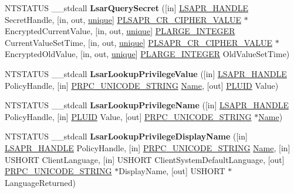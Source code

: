 \begin{DoxyCompactItemize}
\item 
\mbox{\label{interfacelsarpc_a48c9f6d409463cc2d64b30e95d5fe64d}} 
N\+T\+S\+T\+A\+T\+US \+\_\+\+\_\+stdcall {\bfseries Lsar\+Query\+Secret} (\mbox{[}in\mbox{]} \hyperlink{interfacevoid}{L\+S\+A\+P\+R\+\_\+\+H\+A\+N\+D\+LE} Secret\+Handle, \mbox{[}in, out, \hyperlink{interfaceunique}{unique}\mbox{]} \hyperlink{struct___l_s_a_p_r___c_r___c_i_p_h_e_r___v_a_l_u_e}{P\+L\+S\+A\+P\+R\+\_\+\+C\+R\+\_\+\+C\+I\+P\+H\+E\+R\+\_\+\+V\+A\+L\+UE} $\ast$Encrypted\+Current\+Value, \mbox{[}in, out, \hyperlink{interfaceunique}{unique}\mbox{]} \hyperlink{union___l_a_r_g_e___i_n_t_e_g_e_r}{P\+L\+A\+R\+G\+E\+\_\+\+I\+N\+T\+E\+G\+ER} Current\+Value\+Set\+Time, \mbox{[}in, out, \hyperlink{interfaceunique}{unique}\mbox{]} \hyperlink{struct___l_s_a_p_r___c_r___c_i_p_h_e_r___v_a_l_u_e}{P\+L\+S\+A\+P\+R\+\_\+\+C\+R\+\_\+\+C\+I\+P\+H\+E\+R\+\_\+\+V\+A\+L\+UE} $\ast$Encrypted\+Old\+Value, \mbox{[}in, out, \hyperlink{interfaceunique}{unique}\mbox{]} \hyperlink{union___l_a_r_g_e___i_n_t_e_g_e_r}{P\+L\+A\+R\+G\+E\+\_\+\+I\+N\+T\+E\+G\+ER} Old\+Value\+Set\+Time)
\item 
\mbox{\label{interfacelsarpc_a311d0deae1aded8af784931780df9447}} 
N\+T\+S\+T\+A\+T\+US \+\_\+\+\_\+stdcall {\bfseries Lsar\+Lookup\+Privilege\+Value} (\mbox{[}in\mbox{]} \hyperlink{interfacevoid}{L\+S\+A\+P\+R\+\_\+\+H\+A\+N\+D\+LE} Policy\+Handle, \mbox{[}in\mbox{]} \hyperlink{struct___r_p_c___u_n_i_c_o_d_e___s_t_r_i_n_g}{P\+R\+P\+C\+\_\+\+U\+N\+I\+C\+O\+D\+E\+\_\+\+S\+T\+R\+I\+NG} \hyperlink{struct_name_rec__}{Name}, \mbox{[}out\mbox{]} \hyperlink{struct___l_u_i_d}{P\+L\+U\+ID} Value)
\item 
\mbox{\label{interfacelsarpc_a47b15c19adf74a11362fe39097ce9430}} 
N\+T\+S\+T\+A\+T\+US \+\_\+\+\_\+stdcall {\bfseries Lsar\+Lookup\+Privilege\+Name} (\mbox{[}in\mbox{]} \hyperlink{interfacevoid}{L\+S\+A\+P\+R\+\_\+\+H\+A\+N\+D\+LE} Policy\+Handle, \mbox{[}in\mbox{]} \hyperlink{struct___l_u_i_d}{P\+L\+U\+ID} Value, \mbox{[}out\mbox{]} \hyperlink{struct___r_p_c___u_n_i_c_o_d_e___s_t_r_i_n_g}{P\+R\+P\+C\+\_\+\+U\+N\+I\+C\+O\+D\+E\+\_\+\+S\+T\+R\+I\+NG} $\ast$\hyperlink{struct_name_rec__}{Name})
\item 
\mbox{\label{interfacelsarpc_a10f7d77793f8385cd11f8502305c1982}} 
N\+T\+S\+T\+A\+T\+US \+\_\+\+\_\+stdcall {\bfseries Lsar\+Lookup\+Privilege\+Display\+Name} (\mbox{[}in\mbox{]} \hyperlink{interfacevoid}{L\+S\+A\+P\+R\+\_\+\+H\+A\+N\+D\+LE} Policy\+Handle, \mbox{[}in\mbox{]} \hyperlink{struct___r_p_c___u_n_i_c_o_d_e___s_t_r_i_n_g}{P\+R\+P\+C\+\_\+\+U\+N\+I\+C\+O\+D\+E\+\_\+\+S\+T\+R\+I\+NG} \hyperlink{struct_name_rec__}{Name}, \mbox{[}in\mbox{]} U\+S\+H\+O\+RT Client\+Language, \mbox{[}in\mbox{]} U\+S\+H\+O\+RT Client\+System\+Default\+Language, \mbox{[}out\mbox{]} \hyperlink{struct___r_p_c___u_n_i_c_o_d_e___s_t_r_i_n_g}{P\+R\+P\+C\+\_\+\+U\+N\+I\+C\+O\+D\+E\+\_\+\+S\+T\+R\+I\+NG} $\ast$Display\+Name, \mbox{[}out\mbox{]} U\+S\+H\+O\+RT $\ast$Language\+Returned)

\end{DoxyCompactItemize}
